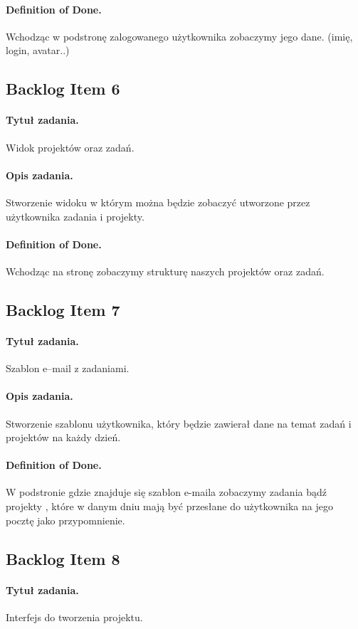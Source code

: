 ﻿\documentclass[a4paper]{article}
\begin{document}
\paragraph{Definition of Done.} Wchodząc w podstronę zalogowanego użytkownika zobaczymy jego dane. (imię, login, avatar..)

\subsection{Backlog Item 6} 
\paragraph{Tytuł zadania.} Widok projektów oraz zadań.
\paragraph{Opis zadania.} Stworzenie widoku w którym można będzie zobaczyć utworzone przez użytkownika zadania i projekty.
\paragraph{Definition of Done.} Wchodząc na stronę zobaczymy strukturę naszych projektów oraz zadań.

\subsection{Backlog Item 7} 
\paragraph{Tytuł zadania.} Szablon e--mail z zadaniami.
\paragraph{Opis zadania.} Stworzenie szablonu użytkownika, który będzie zawierał dane na temat zadań i projektów na każdy dzień.
\paragraph{Definition of Done.} W podstronie gdzie znajduje się szablon e-maila zobaczymy zadania bądź projekty , które w danym dniu mają być przesłane do użytkownika na jego pocztę jako przypomnienie.

\subsection{Backlog Item 8} 
\paragraph{Tytuł zadania.} Interfejs do tworzenia projektu.
\end{document}
